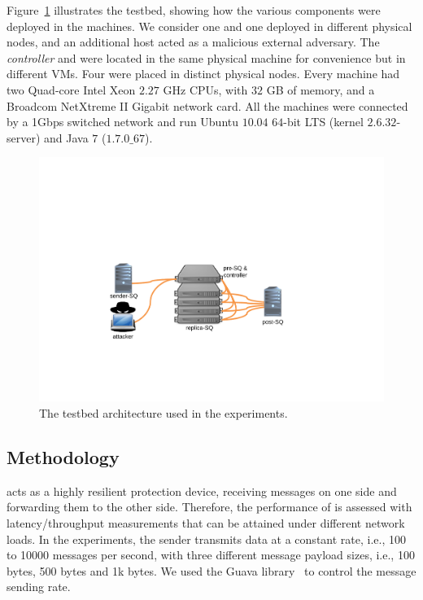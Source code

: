 Figure~\ref{fig:testbed} illustrates the testbed, showing how the various \sieveq components were deployed in the machines.
We consider one \sender and one \postsieve deployed in different physical nodes, and an additional host acted as a malicious external adversary.
The \emph{controller} and \presieves were located in the same physical machine for convenience but in different VMs.
Four \repsieves were placed in distinct physical nodes.
Every machine had two Quad-core Intel Xeon $2.27$ GHz CPUs, with $32$ GB of memory, and a Broadcom NetXtreme II Gigabit network card.
All the machines were connected by a 1Gbps switched network and run Ubuntu $10.04$ $64$-bit LTS (kernel $2.6.32$-server) and Java $7$ ($1.7.0\_67$).


\begin{figure}[ht!]
\includegraphics[width=0.8\columnwidth]{images/images/testbed1.pdf}
\caption{\small The \sieveq testbed architecture used in the experiments.}
\label{fig:testbed}
\end{figure}


\subsection{Methodology}

\sieveq acts as a highly resilient protection device, receiving messages on one side and forwarding them to the other side.
Therefore, the performance of \sieveq is assessed with latency/throughput measurements that can be attained under different network loads. 
In the experiments, the sender transmits data at a constant rate, i.e., 100 to 10000 messages per second, with three different message payload sizes, i.e., 100 bytes, 500 bytes and 1k bytes.
We used the Guava library~\cite{guava} to control the message sending rate.


